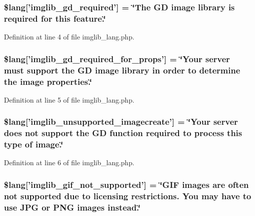 \subsubsection[{\$lang}]{\setlength{\rightskip}{0pt plus 5cm}\$lang['imglib\-\_\-gd\-\_\-required'] = \char`\"{}The G\-D image library is required {\bf for} this feature.\char`\"{}}\label{imglib__lang_8php_aa8d7f8276e62fbe759daef2021c16552}


Definition at line 4 of file imglib\-\_\-lang.\-php.

\subsubsection[{\$lang}]{\setlength{\rightskip}{0pt plus 5cm}\$lang['imglib\-\_\-gd\-\_\-required\-\_\-for\-\_\-props'] = \char`\"{}Your server must support the G\-D image library in order {\bf to} determine the image properties.\char`\"{}}\label{imglib__lang_8php_a0da9c99f9e2b5f38ccbefb9d9f702c5e}


Definition at line 5 of file imglib\-\_\-lang.\-php.

\subsubsection[{\$lang}]{\setlength{\rightskip}{0pt plus 5cm}\$lang['imglib\-\_\-unsupported\-\_\-imagecreate'] = \char`\"{}Your server does {\bf not} support the G\-D function required {\bf to} process this {\bf type} of image.\char`\"{}}\label{imglib__lang_8php_ace032cbe8dafb1f3417a758d0914ecdb}


Definition at line 6 of file imglib\-\_\-lang.\-php.

\subsubsection[{\$lang}]{\setlength{\rightskip}{0pt plus 5cm}\$lang['imglib\-\_\-gif\-\_\-not\-\_\-supported'] = \char`\"{}G\-I\-F images are often {\bf not} supported due {\bf to} licensing restrictions. You may have {\bf to} use J\-P\-G {\bf or} P\-N\-G images instead.\char`\"{}}\label{imglib__lang_8php_a235a59a6660145fc136b3933b5b10675}


